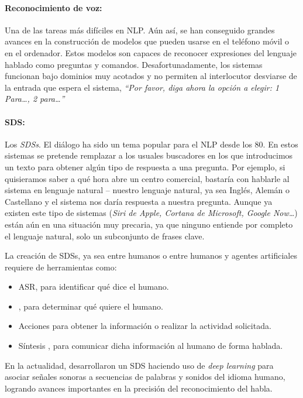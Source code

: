 \paragraph{Reconocimiento de voz:} Una de las tareas más difíciles en
\ac{NLP}. Aún así, se han conseguido grandes avances en la construcción de
modelos que pueden usarse en el teléfono móvil o en el ordenador. Estos modelos
son capaces de reconocer expresiones del lenguaje hablado como preguntas y
comandos. Desafortunadamente, los sistemas
 funcionan bajo dominios muy acotados
y no permiten al interlocutor desviarse de la entrada que espera el sistema, \eg
\emph{``Por favor, diga ahora la opción a elegir: 1 Para\dots, 2 para\dots''}

\paragraph{SDS:} Los \emph{\acp{SDS}}. El diálogo ha sido un tema popular para el \ac{NLP} desde los
80. En estos sistemas se pretende remplazar a los usuales buscadores en los que
introducimos un texto para obtener algún tipo de respuesta a una pregunta. Por
ejemplo, si quisieramos saber a qué hora abre un centro comercial, bastaría con
hablarle al sistema en lenguaje natural -- nuestro lenguaje natural, ya sea
Inglés, Alemán o Castellano y el sistema nos daría respuesta a nuestra
pregunta. Aunque ya existen este tipo de sistemas (\eg \emph{Siri de Apple,
  Cortana de Microsoft, Google Now\dots}) están aún en una situación muy
precaria, ya que ninguno entiende por completo el lenguaje natural, solo un
subconjunto de frases clave.

La creación de \acp{SDS}, ya sea entre humanos o entre humanos y agentes
artificiales requiere de herramientas como:
\begin{itemize}
\item \ac{ASR}, para identificar qué dice el humano.
\item {}, para
  determinar qué quiere el humano.
\item Acciones para obtener la información o realizar la actividad
  solicitada.
\item Síntesis , para comunicar dicha información al humano de forma hablada.
\end{itemize} En la actualidad, \citet{microsoft:sds} desarrollaron un \ac{SDS}
haciendo uso de \emph{deep learning} para asociar señales sonoras a secuencias
de palabras y sonidos del idioma humano, logrando avances importantes en la
precisión del reconocimiento del habla.

